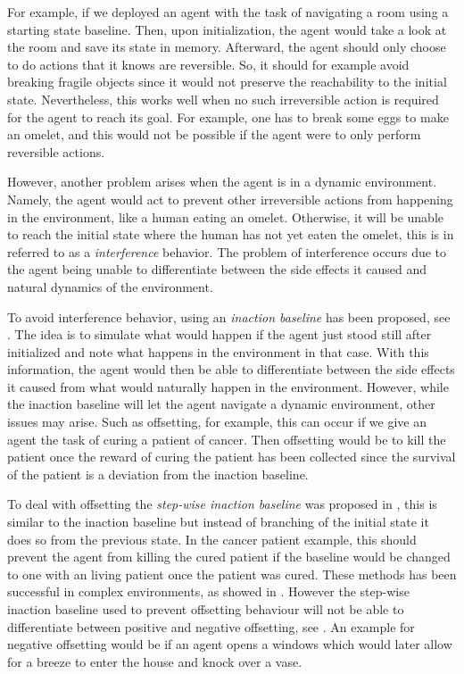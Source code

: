 \documentclass[12pt,A4]{report}
\theoremstyle{definition}
\begin{document}
For example, if we deployed an agent with the task of navigating a room using a starting state baseline. Then, upon initialization, the agent would take a look at the room and save its state in memory. Afterward, the agent should only choose to do actions that it knows are reversible. So, it should for example avoid breaking fragile objects since it would not preserve the reachability to the initial state. Nevertheless, this works well when no such irreversible action is required for the agent to reach its goal. For example, one has to break some eggs to make an omelet, and this would not be possible if the agent were to only perform reversible actions. 

However, another problem arises when the agent is in a dynamic environment. Namely, the agent would act to prevent other irreversible actions from happening in the environment, like a human eating an omelet. Otherwise, it will be unable to reach the initial state where the human has not yet eaten the omelet, this is in \citet{Krakovna19} referred to as a \textit{interference} behavior. The problem of interference occurs due to the agent being unable to differentiate between the side effects it caused and natural dynamics of the environment. 

To avoid interference behavior, using an \textit{inaction baseline} has been proposed, see \citet{Krakovna19}. The idea is to simulate what would happen if the agent just stood still after initialized and note what happens in the environment in that case. With this information, the agent would then be able to differentiate between the side effects it caused from what would naturally happen in the environment. However, while the inaction baseline will let the agent navigate a dynamic environment, other issues may arise. Such as offsetting, for example, this can occur if we give an agent the task of curing a patient of cancer. Then offsetting would be to kill the patient once the reward of curing the patient has been collected since the survival of the patient is a deviation from the inaction baseline.

To deal with offsetting the \textit{step-wise inaction baseline} was proposed in \citet{Krakovna19}, this is similar to the inaction baseline but instead of branching of the initial state it does so from the previous state. In the cancer patient example, this should prevent the agent from killing the cured patient if the baseline would be changed to one with an living patient once the patient was cured. These methods has been successful in complex environments, as showed in \citet{Turner20}. However the step-wise inaction baseline used to prevent offsetting behaviour will not be able to differentiate between positive and negative offsetting, see \citet{Krakovna20}. An example for negative offsetting would be if an agent opens a windows which would later allow for a breeze to enter the house and knock over a vase. 
\end{document}

